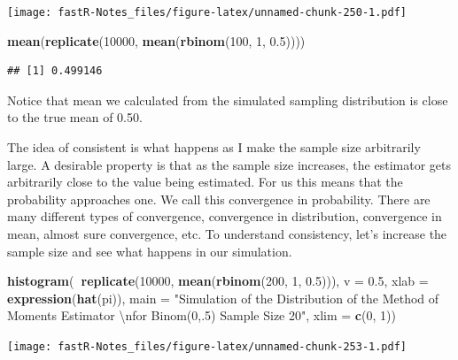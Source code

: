 \documentclass[]{book}
\newenvironment{Shaded}{\begin{snugshade}}{\end{snugshade}}
\newcommand{\KeywordTok}[1]{\textcolor[rgb]{0.13,0.29,0.53}{\textbf{#1}}}
\newcommand{\DataTypeTok}[1]{\textcolor[rgb]{0.13,0.29,0.53}{#1}}
\newcommand{\DecValTok}[1]{\textcolor[rgb]{0.00,0.00,0.81}{#1}}
\newcommand{\FloatTok}[1]{\textcolor[rgb]{0.00,0.00,0.81}{#1}}
\newcommand{\CharTok}[1]{\textcolor[rgb]{0.31,0.60,0.02}{#1}}
\newcommand{\StringTok}[1]{\textcolor[rgb]{0.31,0.60,0.02}{#1}}
\newcommand{\OperatorTok}[1]{\textcolor[rgb]{0.81,0.36,0.00}{\textbf{#1}}}
\newcommand{\NormalTok}[1]{#1}
\theoremstyle{definition}
\theoremstyle{definition}
\theoremstyle{definition}
\theoremstyle{remark}
\begin{document}
\texttt{[image: fastR-Notes\_files/figure-latex/unnamed-chunk-250-1.pdf]}

\begin{Shaded}
\begin{Highlighting}[]
\KeywordTok{mean}\NormalTok{(}\KeywordTok{replicate}\NormalTok{(}\DecValTok{10000}\NormalTok{, }\KeywordTok{mean}\NormalTok{(}\KeywordTok{rbinom}\NormalTok{(}\DecValTok{100}\NormalTok{, }\DecValTok{1}\NormalTok{, }\FloatTok{0.5}\NormalTok{))))}
\end{Highlighting}
\end{Shaded}

\begin{verbatim}
## [1] 0.499146
\end{verbatim}

Notice that mean we calculated from the simulated sampling distribution
is close to the true mean of 0.50.

The idea of consistent is what happens as I make the sample size
arbitrarily large. A desirable property is that as the sample size
increases, the estimator gets arbitrarily close to the value being
estimated. For us this means that the probability approaches one. We
call this convergence in probability. There are many different types of
convergence, convergence in distribution, convergence in mean, almost
sure convergence, etc. To understand consistency, let's increase the
sample size and see what happens in our simulation.

\begin{Shaded}
\begin{Highlighting}[]
\KeywordTok{histogram}\NormalTok{(}\OperatorTok{~}\KeywordTok{replicate}\NormalTok{(}\DecValTok{10000}\NormalTok{, }\KeywordTok{mean}\NormalTok{(}\KeywordTok{rbinom}\NormalTok{(}\DecValTok{200}\NormalTok{, }\DecValTok{1}\NormalTok{, }\FloatTok{0.5}\NormalTok{))), }\DataTypeTok{v =} \FloatTok{0.5}\NormalTok{, }\DataTypeTok{xlab =} \KeywordTok{expression}\NormalTok{(}\KeywordTok{hat}\NormalTok{(pi)), }
    \DataTypeTok{main =} \StringTok{"Simulation of the Distribution of the Method of Moments Estimator }\CharTok{\textbackslash{}n}\StringTok{for Binom(0,.5) Sample Size 20"}\NormalTok{, }
    \DataTypeTok{xlim =} \KeywordTok{c}\NormalTok{(}\DecValTok{0}\NormalTok{, }\DecValTok{1}\NormalTok{))}
\end{Highlighting}
\end{Shaded}

\texttt{[image: fastR-Notes\_files/figure-latex/unnamed-chunk-253-1.pdf]}
\end{document}

